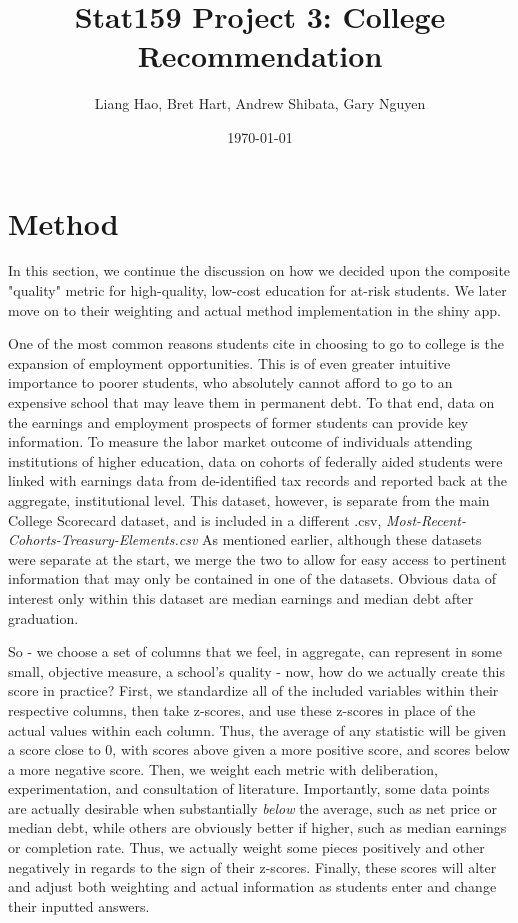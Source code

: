 \documentclass{article}\usepackage[]{graphicx}\usepackage[]{color}
\title{Stat159 Project 3: College Recommendation}
\author{Liang Hao, Bret Hart, Andrew Shibata, Gary Nguyen}
\date{\today}
\begin{document}
\maketitle
\section{Method}

In this section, we continue the discussion on how we decided upon the composite "quality" metric for high-quality, low-cost education for at-risk students. We later move on to their weighting and actual method implementation in the shiny app. \newline

One of the most common reasons students cite in choosing to go to college is the expansion of employment opportunities. This is of even greater intuitive importance to poorer students, who absolutely cannot afford to go to an expensive school that may leave them in permanent debt. To that end, data on the earnings and employment prospects of former students can provide key information. To measure the labor market outcome of individuals attending institutions of higher education, data on cohorts of federally aided students were linked with earnings data from de-identified tax records and reported back at the aggregate, institutional level. This dataset, however, is separate from the main College Scorecard dataset, and is included in a different .csv, \emph{Most-Recent-Cohorts-Treasury-Elements.csv} As mentioned earlier, although these datasets were separate at the start, we merge the two to allow for easy access to pertinent information that may only be contained in one of the datasets. Obvious data of interest only within this dataset are median earnings and median debt after graduation.\newline

So - we choose a set of columns that we feel, in aggregate, can represent in some small, objective measure, a school's quality - now, how do we actually create this score in practice? First, we standardize all of the included variables within their respective columns, then take z-scores, and use these z-scores in place of the actual values within each column. Thus, the average of any statistic will be given a score close to 0, with scores above given a more positive score, and scores below a more negative score. Then, we weight each metric with deliberation, experimentation, and consultation of literature. Importantly, some data points are actually desirable when substantially \emph{below} the average, such as net price or median debt, while others are obviously better if higher, such as median earnings or completion rate. Thus, we actually weight some pieces positively and other negatively in regards to the sign of their z-scores. Finally, these scores will alter and adjust both weighting and actual information as students enter and change their inputted answers. \newline
\end{document}
